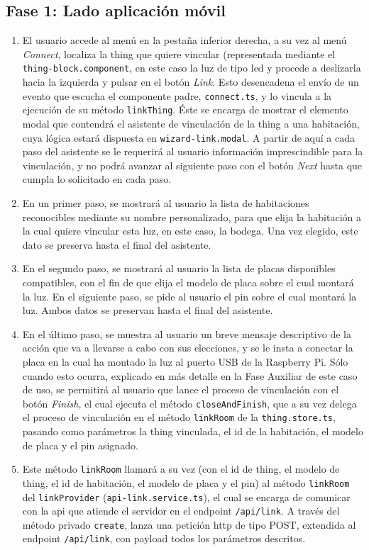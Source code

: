 \subsection{Fase 1: Lado aplicación móvil}
\label{ch:Capitulo6.2.1}
\begin{enumerate}
\item  El usuario accede al menú en la pestaña inferior derecha, a su vez al menú \textit{Connect}, localiza la thing que quiere vincular (representada mediante el \verb|thing-block.component|, en este caso la luz de tipo led y procede a deslizarla hacia la izquierda y pulsar en el botón \textit{Link}. Esto desencadena el envío de un evento que escucha el componente padre, \verb|connect.ts|, y lo vincula a la ejecución de su método \verb|linkThing|. Éste se encarga de mostrar el elemento modal que contendrá el asistente de vinculación de la thing a una habitación, cuya lógica estará dispuesta en \verb|wizard-link.modal|. A partir de aquí a cada paso del asistente se le requerirá al usuario información imprescindible para la vinculación, y no podrá avanzar al siguiente paso con el botón \textit{Next} hasta que cumpla lo solicitado en cada paso.

\item  En un primer paso, se mostrará al usuario la lista de habitaciones reconocibles mediante su nombre personalizado, para que elija la habitación a la cual quiere vincular esta luz, en este caso, la bodega. Una vez elegido, este dato se preserva hasta el final del asistente.

\item En el segundo paso, se mostrará al usuario la lista de placas disponibles compatibles, con el fin de que elija el modelo de placa sobre el cual montará la luz. En el siguiente paso, se pide al usuario el pin sobre el cual montará la luz. Ambos datos se preservan hasta el final del asistente.

\item  En el último paso, se muestra al usuario un breve mensaje descriptivo de la acción que va a llevarse a cabo con sus elecciones, y se le insta a conectar la placa en la cual ha montado la luz al puerto USB de la Raspberry Pi. Sólo cuando esto ocurra, explicado en más detalle en la Fase Auxiliar de este caso de uso, se permitirá al usuario que lance el proceso de vinculación con el botón \textit{Finish}, el cual ejecuta el método \verb|closeAndFinish|, que a su vez delega el proceso de vinculación en el método \verb|linkRoom| de la \verb|thing.store.ts|, pasando como parámetros la thing vinculada, el id de la habitación, el modelo de placa y el pin asignado.

\item  Este método \verb|linkRoom| llamará a su vez (con el id de thing, el modelo de thing, el id de habitación, el modelo de placa y el pin) al método \verb|linkRoom| del \verb|linkProvider| (\verb|api-link.service.ts|), el cual se encarga de comunicar con la api que atiende el servidor en el endpoint \verb|/api/link|. A través del método privado \verb|create|, lanza una petición http de tipo POST, extendida al endpoint \verb|/api/link|, con payload todos los parámetros descritos.
\end{enumerate}

